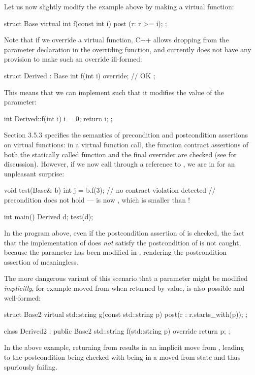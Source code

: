 Let us now slightly modify the example above by making  a virtual function:
\begin{codeblock}
struct Base {
  virtual int f(const int i) post (r: r >= i);
};
\end{codeblock}
Note that if we override a virtual function, C++ allows dropping  from the parameter declaration in the overriding function, and \cite{P2900R10} currently does not have any provision to make such an override ill-formed:
\begin{codeblock}
struct Derived : Base {
  int f(int i) override; // OK
};
\end{codeblock}
This means that we can implement  such that it modifies the value of the parameter:
\begin{codeblock}
int Derived::f(int i) {
  i = 0;
  return i;
};
\end{codeblock}
\cite{P2900R10} Section 3.5.3 specifies the semantics of precondition and postcondition assertions on virtual functions: in a virtual function call, the function contract assertions of both the statically called function  and the final overrider  are checked (see \cite{P3097R0} for discussion). However, if we now call  through a reference to , we are in for an unpleasant surprise:
\begin{codeblock}
void test(Base& b) {
  int j = b.f(3);  // no contract violation detected
  // precondition does not hold ---  is now , which is smaller than !
}

int main() {
  Derived d;
  test(d);
}
\end{codeblock}

In the program above, even if the postcondition assertion of  is checked, the fact that the implementation of  does \emph{not} satisfy the postcondition of  is not caught, because the parameter  has been modified in , rendering the postcondition assertion of  meaningless.

The more dangerous variant of this scenario that a parameter might be modified \emph{implicitly}, for example moved-from when returned by value, is also possible and well-formed:
\begin{codeblock}
struct Base2 {
  virtual std::string g(const std::string p) post(r : r.starts_with(p));
};

class Derived2 : public Base2 {
  std::string f(std::string p) override {
    return p;
  }
};
\end{codeblock}
In the above example, returning  from  results in an implicit move from , leading to the postcondition being checked with  being in a moved-from state and thus spuriously failing.


